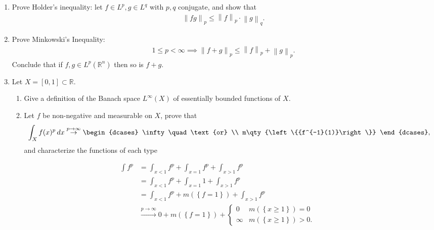 \begin{enumerate}
\def\labelenumi{\alph{enumi}.}
\item
  Prove Holder's inequality: let \(f\in L^p, g\in L^q\) with \(p, q\)
  conjugate, and show that
  \begin{align*}
  {\left\lVert {fg} \right\rVert}_{p} \leq {\left\lVert {f} \right\rVert}_{p} \cdot {\left\lVert {g} \right\rVert}_{q}
  .\end{align*}
\item
  Prove Minkowski's Inequality:
  \begin{align*}
  1\leq p < \infty \implies {\left\lVert {f+g} \right\rVert}_{p} \leq {\left\lVert {f} \right\rVert}_{p}+ {\left\lVert {g} \right\rVert}_{p}
  .\end{align*}
  Conclude that if \(f, g\in L^p({\mathbb{R}}^n)\) then so is \(f+g\).
\item
  Let \(X = [0, 1] \subset {\mathbb{R}}\).

  \begin{enumerate}
  \def\labelenumii{\arabic{enumii}.}
  \item
    Give a definition of the Banach space \(L^\infty(X)\) of essentially
    bounded functions of \(X\).
  \item
    Let \(f\) be non-negative and measurable on \(X\), prove that
    \begin{align*}
     \int_X f(x)^p \,dx \overset{p\to\infty}\to
     \begin{dcases}
     \infty \quad\text{or} \\
     m\qty{\left\{{f^{-1}(1)}\right\}}
     \end{dcases}
     ,\end{align*}
    and characterize the functions of each type
  \end{enumerate}
\end{enumerate}

\begin{solution}

\begin{align*}
\int f^p 
&= \int_{x < 1} f^p + \int_{x=1}f^p + \int_{x > 1} f^p\\
&= \int_{x < 1} f^p + \int_{x=1}1 + \int_{x > 1} f^p \\
&= \int_{x < 1} f^p + m(\left\{{f = 1}\right\}) + \int_{x > 1} f^p \\
&\overset{p\to\infty}\to 0  + m(\left\{{f = 1}\right\}) + 
\begin{cases} 
0 & m(\left\{{x\geq 1}\right\}) = 0 \\ 
\infty & m(\left\{{x\geq 1}\right\}) > 0.
\end{cases}
\end{align*}

\end{solution}

